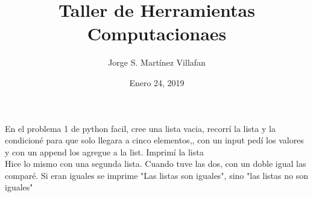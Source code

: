 \documentclass[letterpaper, 12pt, oneside]{article}%
\title{\Huge Taller de Herramientas Computacionaes}
\author{Jorge S. Martínez Villafan}
\date{Enero 24, 2019}
\begin{document}
En el problema 1 de python facil, cree una lista vacia, recorrí la lista y la condicioné para que solo llegara a cinco elementos,, con un input pedí los valores y con un append los agregue a la list. Imprimí la lista \\ Hice lo mismo con una segunda lista. Cuando tuve las dos, con un doble igual las comparé. Si eran iguales se imprime "Las listas son iguales", sino "las listas no son iguales"
\end{document}
